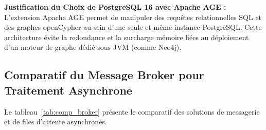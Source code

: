 \begin{table}[H]
\centering
\caption{Analyse Comparative des Solutions de Base de Donn\'ees et Graphes}
\label{tab:comp_db}
%
\end{table}
\par \textbf{Justification du Choix de PostgreSQL 16 avec Apache AGE :} L'extension Apache AGE permet de manipuler des requ\^etes relationnelles SQL et des graphes openCypher au sein d'une seule et m\^eme instance PostgreSQL. Cette architecture \'evite la redondance et la surcharge m\'emoire li\'ees au d\'eploiement d'un moteur de graphe d\'edi\'e sous JVM (comme Neo4j).

\subsection{Comparatif du Message Broker pour Traitement Asynchrone}
\par Le tableau~\ref{tab:comp_broker} pr\'esente le comparatif des solutions de messagerie et de files d'attente asynchrones.

